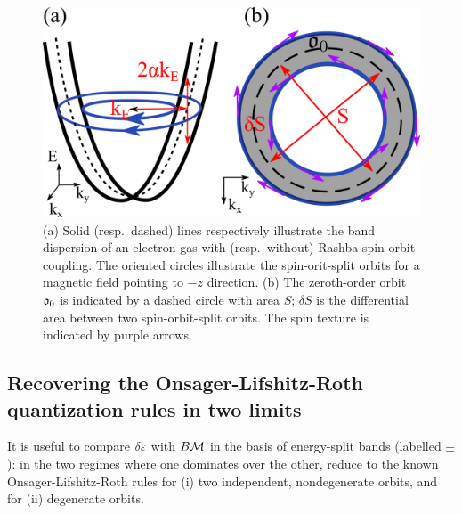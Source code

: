 \documentclass[aps, prb, showpacs, twocolumn, notitlepage, superscriptaddress]{revtex4-1}
\begin{document}
\begin{figure}
\includegraphics[width=0.9\columnwidth]{orbits.png}
\caption{(a) Solid (resp.\ dashed) lines respectively illustrate the band dispersion of an electron gas with (resp.\ without) Rashba spin-orbit coupling.  The oriented circles illustrate the spin-orit-split orbits for a magnetic field pointing to $-z$ direction. (b) The zeroth-order orbit $\mathfrak{o}_0$ is indicated by a dashed circle with area $S$; $\delta S$ is the differential area  between two spin-orbit-split orbits. The spin texture is indicated by purple arrows.\label{fig:orbits}}
\end{figure}


\subsection{Recovering the Onsager-Lifshitz-Roth quantization rules in two limits}

It is useful to compare $\delta \varepsilon$ with $B{\cal M}$ in the basis of energy-split bands (labelled $\pm$): in the two regimes where one dominates over the other,  reduce to the known Onsager-Lifshitz-Roth rules for (i) two independent, nondegenerate orbits, and for (ii) degenerate orbits.  \\

\end{document}
